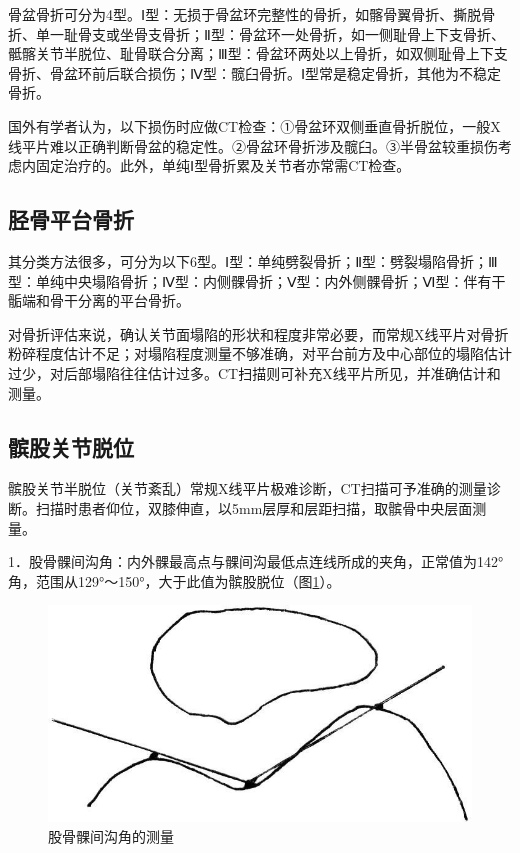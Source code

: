 骨盆骨折可分为4型。Ⅰ型：无损于骨盆环完整性的骨折，如髂骨翼骨折、撕脱骨折、单一耻骨支或坐骨支骨折；Ⅱ型：骨盆环一处骨折，如一侧耻骨上下支骨折、骶髂关节半脱位、耻骨联合分离；Ⅲ型：骨盆环两处以上骨折，如双侧耻骨上下支骨折、骨盆环前后联合损伤；Ⅳ型：髋臼骨折。Ⅰ型常是稳定骨折，其他为不稳定骨折。

国外有学者认为，以下损伤时应做CT检查：①骨盆环双侧垂直骨折脱位，一般X线平片难以正确判断骨盆的稳定性。②骨盆环骨折涉及髋臼。③半骨盆较重损伤考虑内固定治疗的。此外，单纯Ⅰ型骨折累及关节者亦常需CT检查。

\subsection{胫骨平台骨折}

其分类方法很多，可分为以下6型。Ⅰ型：单纯劈裂骨折；Ⅱ型：劈裂塌陷骨折；Ⅲ型：单纯中央塌陷骨折；Ⅳ型：内侧髁骨折；Ⅴ型：内外侧髁骨折；Ⅵ型：伴有干骺端和骨干分离的平台骨折。

对骨折评估来说，确认关节面塌陷的形状和程度非常必要，而常规X线平片对骨折粉碎程度估计不足；对塌陷程度测量不够准确，对平台前方及中心部位的塌陷估计过少，对后部塌陷往往估计过多。CT扫描则可补充X线平片所见，并准确估计和测量。

\subsection{髌股关节脱位}

髌股关节半脱位（关节紊乱）常规X线平片极难诊断，CT扫描可予准确的测量诊断。扫描时患者仰位，双膝伸直，以5mm层厚和层距扫描，取髌骨中央层面测量。

1．股骨髁间沟角：内外髁最高点与髁间沟最低点连线所成的夹角，正常值为142°角，范围从129°～150°，大于此值为髌股脱位（图\ref{fig22-5}）。

\begin{figure}[!htbp]
 \centering
 \includegraphics[width=.7\textwidth,height=\textheight,keepaspectratio]{./images/Image00421.jpg}
 \captionsetup{justification=centering}
 \caption{股骨髁间沟角的测量}
 \label{fig22-5}
  \end{figure} 

